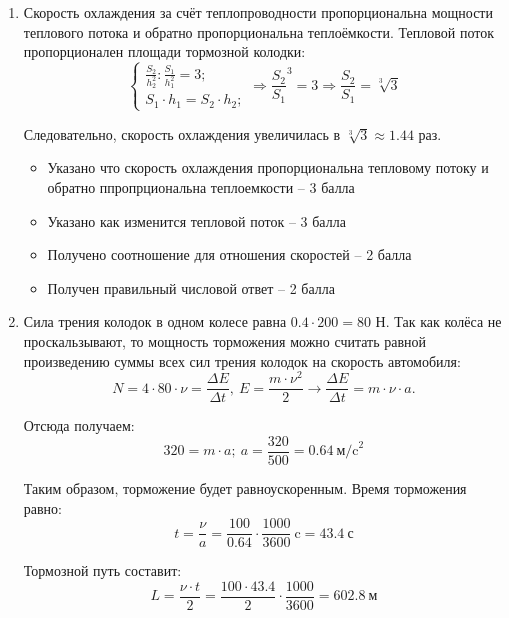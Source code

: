\solutionSection

\begin{enumerate}
    \item Скорость охлаждения за счёт теплопроводности пропорциональна мощности теплового потока и обратно пропорциональна теплоёмкости. Тепловой поток пропорционален площади тормозной колодки:
    $$ \left\{
        \begin{aligned}
            \frac{S_2}{h_2^2}:\frac{S_1}{h_1^2} = 3;\\
            S_1 \cdot h_1=S_2 \cdot h_2;
        \end{aligned}
    \right.
    \Rightarrow \frac{S_2}{S_1}^3=3 \Rightarrow  \frac{S_2}{S_1} = \sqrt[3]{3}$$   

    Следовательно, скорость охлаждения увеличилась в  $\sqrt[3]{3} \approx 1.44$ раз.
    

    \markSection

    \begin{itemize}
        \item Указано что скорость охлаждения пропорциональна тепловому потоку и обратно ппропрциональна теплоемкости – 3 балла
        \item Указано как изменится тепловой поток – 3 балла
        \item Получено соотношение для отношения скоростей – 2 балла
        \item Получен правильный числовой ответ – 2 балла
    \end{itemize}

    \item Сила трения колодок в одном колесе равна $0.4 \cdot 200 = 80$ Н. Так как колёса не проскальзывают, то мощность торможения можно считать равной произведению суммы всех сил трения колодок на скорость автомобиля:
    $$N=4 \cdot 80 \cdot \nu=\frac{\Delta E}{\Delta t}, \: E=\frac{m \cdot \nu^2}{2} \rightarrow \frac{\Delta E}{\Delta t}= m \cdot \nu \cdot a.$$

    Отсюда получаем:
    $$320=m \cdot a; \: a=\frac{320}{500}=0.64 \: \text{м/c}^2 $$
    
    Таким образом, торможение будет равноускоренным. Время торможения равно:
    $$t=\frac{\nu}{a}=\frac{100}{0.64} \cdot \frac{1000}{3600} \: \text{c}=43.4 \: \text{с}$$

    Тормозной путь составит: 
    $$L=\frac{\nu \cdot t}{2}=\frac{100 \cdot 43.4}{2} \cdot \frac{1000}{3600}=602.8 \: \text{м}$$


\end{enumerate}

